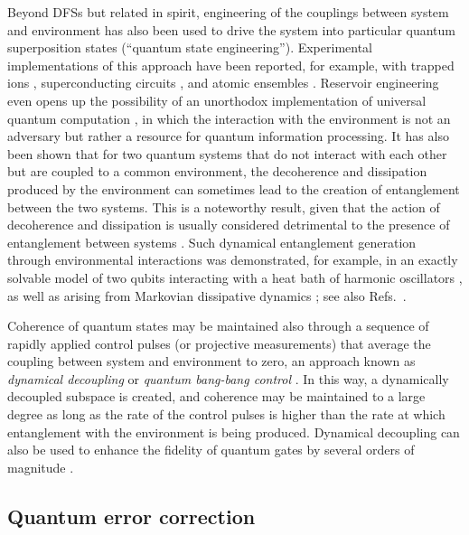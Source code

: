 \documentclass[3p,sort&compress]{elsarticle}
\begin{document}
Beyond DFSs but related in spirit, engineering of the couplings between system and  environment has also been used to drive the system into particular quantum superposition states (``quantum state engineering''). Experimental implementations of this approach have been reported, for example, with trapped ions \cite{Barreiro:2011:oo,Lin:2013:pp,Kienzler:2015:oo}, superconducting circuits \cite{Shankar:2013:pp}, and atomic ensembles \cite{Krauter:2011:ll}. Reservoir engineering even opens up the possibility of an unorthodox implementation of universal quantum computation \cite{Verstraete:2009:ii}, in which the interaction with the environment is not an adversary but rather a resource for quantum information processing. It has also been shown \cite{Braun:2002:aa, Benatti:2003:aa,Kim:2002:oo,Jakobczyk:2002:oo} that for two quantum systems that do not interact with each other but are coupled to a common environment, the decoherence and dissipation produced by the environment can sometimes lead to the creation of entanglement between the two systems. This is a noteworthy result, given that the action of decoherence and dissipation is usually considered detrimental to the presence of entanglement between systems \cite{Zyczkowski:2001:ii,Lee:2004:uu,Barreiro:2010:aa}. Such dynamical entanglement generation through environmental interactions was demonstrated, for example, in an exactly solvable model of two qubits interacting with a heat bath of harmonic oscillators \cite{Braun:2002:aa}, as well as arising from Markovian dissipative dynamics \cite{Benatti:2003:aa}; see also Refs.~\cite{Kim:2002:oo,Jakobczyk:2002:oo}. 

Coherence of quantum states may be maintained also through a sequence of rapidly applied control pulses (or projective measurements) that average the coupling between system and environment to zero, an approach known as \emph{dynamical decoupling} or \emph{quantum bang-bang control} \cite{Viola:1998:uu,Viola:1999:zp,Zanardi:1999:oo,Viola:2000:pp,Wu:2002:aa,Wu:2002:bb}. In this way, a dynamically decoupled subspace is created, and coherence may be maintained to a large degree as long as the rate of the control pulses is higher than the rate at which entanglement with the environment is being produced. Dynamical decoupling can also be used to enhance the fidelity of quantum gates by several orders of magnitude \cite{Viola:1999:pp,West:2010:oo}.

\subsection{\label{sec:corr-decoh-induc}Quantum error correction}
\end{document}
